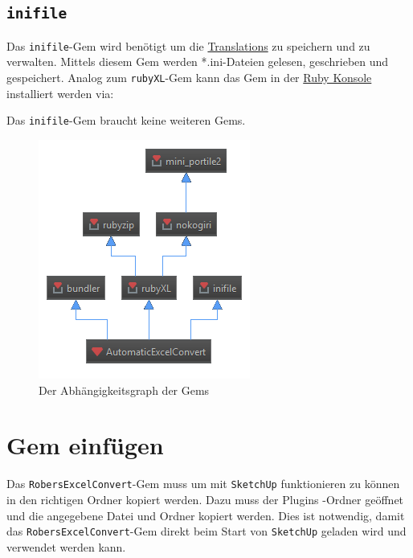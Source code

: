 \documentclass{book}
\newcommand{\sketchup}{\texttt{SketchUp}\xspace}
\newcommand{\rubyXL}{\texttt{rubyXL}\xspace}
\newcommand{\inifile}{\texttt{inifile}\xspace}
\newcommand{\robersexcelconvert}{\texttt{RobersExcelConvert}\xspace}
\begin{document}
			\subsection{\inifile} \label{inifile}
				Das \inifile-Gem wird benötigt um die \hyperref[Translations]{Translations} zu speichern und zu verwalten. Mittels diesem Gem werden *.ini-Dateien gelesen, geschrieben und gespeichert. Analog zum \rubyXL-Gem kann das Gem in der \hyperref[Ruby Konsole]{Ruby Konsole} installiert werden via:
				
				Das \inifile-Gem braucht keine weiteren Gems.
			\begin{figure}
				\centering
				\includegraphics[scale=0.6]{pics/Gemdependency-full.png}
				\caption{Der Abhängigkeitsgraph der Gems}
				\label{Abhaengigkeitsgraph}
			\end{figure}
		\section{Gem einfügen}
			Das \robersexcelconvert-Gem muss um mit \sketchup funktionieren zu können in den richtigen Ordner kopiert werden. 
			Dazu muss der \glqq Plugins \grqq-Ordner geöffnet und die angegebene Datei und Ordner kopiert werden.
			Dies ist notwendig, damit das \robersexcelconvert-Gem direkt beim Start von \sketchup geladen wird und verwendet werden kann.
\end{document}
